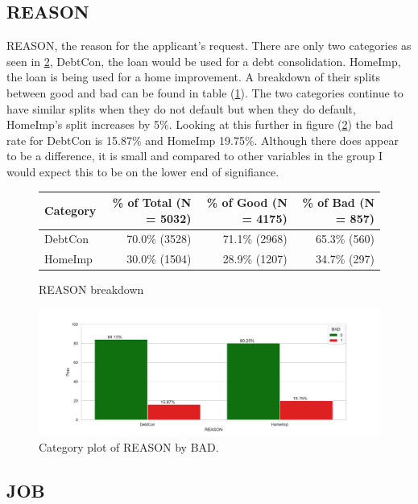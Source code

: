 \subsection*{REASON}

REASON, the reason for the applicant's request. There are only two categories as seen in \ref{reason_cat}, DebtCon, the loan would be used for a debt consolidation. HomeImp, the loan is being used for a home improvement. A breakdown of their splits between good and bad can be found in table (\ref{reason_count_tbl}). The two categories continue to have similar splits when they do not default but when they do default, HomeImp's split increases by 5\%. Looking at this further in figure (\ref{reason_cat}) the bad rate for DebtCon is 15.87\% and HomeImp 19.75\%. Although there does appear to be a difference, it is small and compared to other variables in the group I would expect this to be on the lower end of signifiance.

\begin{figure}[ht]
	\centering
	\renewcommand{\arraystretch}{2}
	\begin{tabular}{lrrr}
		\toprule
		Category & \% of Total (N = 5032) & \% of Good (N = 4175) & \% of Bad (N = 857) \\
		\midrule
		DebtCon &  70.0\% (3528) & 71.1\% (2968) & 65.3\% (560)  \\
		HomeImp & 30.0\% (1504) & 28.9\% (1207) &  34.7\% (297)  \\
		\bottomrule
	\end{tabular}
	\caption{REASON breakdown \label{reason_count_tbl}}
\end{figure}

\begin{figure}[!ht]
	\centering
	\includegraphics[scale=0.40]{figs/reason_cat.pdf}
	\caption{Category plot of REASON by BAD. \label{reason_cat}}
\end{figure}

\subsection*{JOB}

